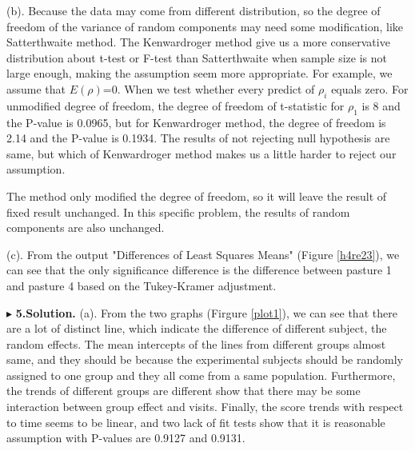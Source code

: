 \documentclass[letterpaper, 12pt]{article}
\begin{document}
(b). Because the data may come from different distribution, so the degree of freedom of the variance of random components may need some modification, like Satterthwaite method. The Kenwardroger method give us a more conservative distribution about t-test or F-test than Satterthwaite when sample size is not large enough, making the assumption seem more appropriate. For example, we assume that $E(\rho)$=0. When we test whether every predict of $\rho_i$ equals zero. For unmodified degree of freedom, the degree of freedom of t-statistic for $\rho_1$ is 8 and the P-value is 0.0965, but for Kenwardroger method, the degree of freedom is 2.14 and the P-value is 0.1934. The results of not rejecting null hypothesis are same, but which of Kenwardroger method makes us a little harder to reject our assumption.

The method only modified the degree of freedom, so it will leave the result of fixed result unchanged. In this specific problem, the results of random components are also unchanged.

(c). From the output "Differences of Least Squares Means" (Figure \ref{h4re23}), we can see that the only significance difference is the difference between pasture 1 and pasture 4 based on the Tukey-Kramer adjustment.

$\blacktriangleright$ \textbf{5.\quad Solution.}
(a). From the two graphs (Firgure \ref{plot1}), we can see that there are a lot of distinct line, which indicate the difference of different subject, the random effects. The mean intercepts of the lines from different groups almost same, and they should be because the experimental subjects should be randomly assigned to one group and they all come from a same population. Furthermore, the trends of different groups are different show that there may be some interaction between group effect and visits. Finally, the score trends with respect to time seems to be linear, and two lack of fit tests show that it is reasonable assumption with P-values are 0.9127 and 0.9131.
\end{document}
